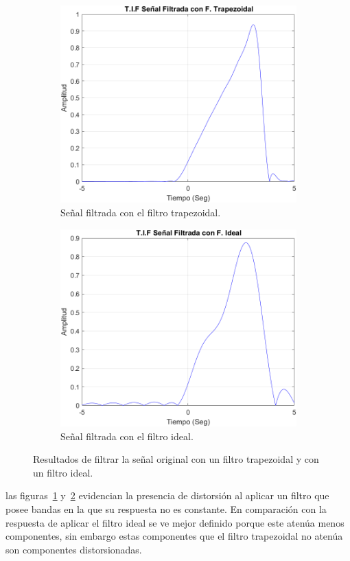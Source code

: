 \begin{figure}[H]
	\centering
	\begin{subfigure}[b]{0.48\linewidth}
		\includegraphics[width=\linewidth]{img/T1Hz}
		\caption{\scriptsize Señal filtrada con el filtro trapezoidal.}
		\label{subfig:distorsionTrapezoidal}
	\end{subfigure}
	\begin{subfigure}[b]{0.48\linewidth}
		\includegraphics[width=\linewidth]{img/I1Hz}
		\caption{\scriptsize Señal filtrada con el filtro ideal.}
		\label{subfig:distorsionIdeal}
	\end{subfigure}
	\caption{\scriptsize Resultados de filtrar la señal original con un filtro trapezoidal y con un filtro ideal.}
	\label{fig:distorsion}
	\vspace{-5mm}
\end{figure}

las figuras~\ref{subfig:distorsionTrapezoidal} y~\ref{subfig:distorsionIdeal} evidencian la presencia de distorsión al aplicar un filtro que posee bandas en la que su respuesta no es constante. En comparación con la respuesta de aplicar el filtro ideal se ve mejor definido porque este atenúa menos componentes, sin embargo estas componentes que el filtro trapezoidal no atenúa son componentes distorsionadas.
